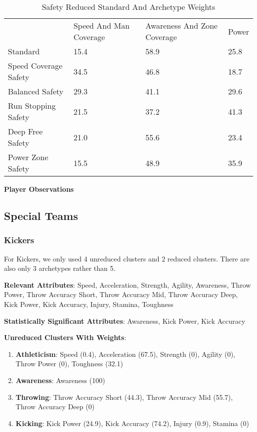 \documentclass[11pt]{article}
\begin{document}
\begin{table}[]
\centering
\caption{Safety Reduced Standard And Archetype Weights}
\label{SafetyReducedWeights}
\begin{tabular}{llll}
                      & Speed And Man Coverage & Awareness And Zone Coverage & Power \\
Standard              & 15.4                   & 58.9                        & 25.8  \\
Speed Coverage Safety & 34.5                   & 46.8                        & 18.7  \\
Balanced Safety       & 29.3                   & 41.1                        & 29.6  \\
Run Stopping Safety   & 21.5                   & 37.2                        & 41.3  \\
Deep Free Safety      & 21.0                   & 55.6                        & 23.4  \\
Power Zone Safety     & 15.5                   & 48.9                        & 35.9 
\end{tabular}
\end{table}

\textbf{Player Observations}

\subsection{Special Teams}
\subsubsection{Kickers}

For Kickers, we only used 4 unreduced clusters and 2 reduced clusters. There are also only 3 archetypes rather than 5.

\textbf{Relevant Attributes}: Speed, Acceleration, Strength, Agility, Awareness, Throw Power, Throw Accuracy Short, Throw Accuracy Mid, Throw Accuracy Deep, Kick Power, Kick Accuracy, Injury, Stamina, Toughness

\textbf{Statistically Significant Attributes}: Awareness, Kick Power, Kick Accuracy

\textbf{Unreduced Clusters With Weights}:

\begin{enumerate}
\item{\textbf{Athleticism}}: Speed (0.4), Acceleration (67.5), Strength (0), Agility (0), Throw Power (0), Toughness (32.1)
\item{\textbf{Awareness}}: Awareness (100)
\item{\textbf{Throwing}}: Throw Accuracy Short (44.3), Throw Accuracy Mid (55.7), Throw Accuracy Deep (0)
\item{\textbf{Kicking}}: Kick Power (24.9), Kick Accuracy (74.2), Injury (0.9), Stamina (0)
\end{enumerate}
\end{document}

